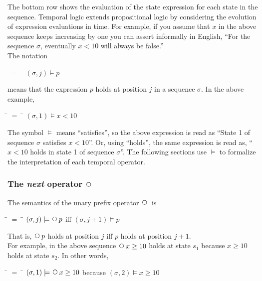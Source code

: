 \documentclass[fleqn, leqno]{article}
\newcommand{\mymathindent}{24pt} %
\newcommand{\Next}{\;\,\text{\raisebox{3.5pt}{\circle{6}}}}
\begin{document}
The bottom row shows the evaluation of the state expression for each state in the sequence.
Temporal logic extends propositional logic by considering the evolution of expression evaluations in time.
For example, if you assume that $x$ in the above sequence keeps increasing by one you can assert
informally in English, ``For the sequence $\sigma$, eventually $x<10$ will always be false.''\\

The notation

\begin{tabbing}
\hspace{\mymathindent} \= $= \;$ \= \kill
\> $(\sigma, j) \models p$
\end{tabbing}

means that the expression $p$ holds at position $j$ in a sequence $\sigma$.
In the above example,

\begin{tabbing}
\hspace{\mymathindent} \= $= \;$ \= \kill
\> $(\sigma, 1) \models x<10$
\end{tabbing}

The symbol $\models$ means ``satisfies'', so the above expression is read as
``State 1 of sequence $\sigma$ satisfies $x<10$''.
Or, using ``holds'', the same expression is read as, ``$x<10$ holds in state 1 of sequence $\sigma$''.
The following sections use $\models$ to formalize the interpretation of each temporal operator.

\subsubsection*{The \textit{next} operator $\Next$}

The semantics of the unary prefix operator $\Next$ is

\begin{tabbing}
\hspace{\mymathindent} \= $= \;$ \= \kill
\> $(\sigma, j) \models \Next p$ \quad iff \quad $(\sigma, j+1) \models p$
\end{tabbing}

That is, $\Next p$ holds at position $j$ iff $p$ holds at position $j+1$.\\

For example, in the above sequence $\Next x \ge 10$ holds at state $s_1$ because $x \ge 10$
holds at state $s_2$.
In other words,

\begin{tabbing}
\hspace{\mymathindent} \= $= \;$ \= \kill
\> $(\sigma, 1) \models \Next x \ge 10$ \quad because \quad $(\sigma, 2) \models x \ge 10$
\end{tabbing}
\end{document}
